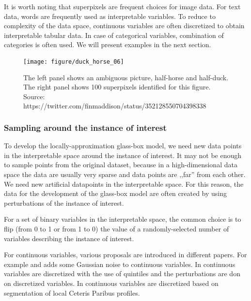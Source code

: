 \documentclass[12pt,]{krantz}
\begin{document}
It is worth noting that superpixels are frequent choices for image data. For text data, words are frequently used as interpretable variables. To reduce to complexity of the data space, continuous variables are often discretized to obtain interpretable tabular data. In case of categorical variables, combination of categories is often used. We will present examples in the next section.

\begin{figure}

{\centering \texttt{[image: figure/duck\_horse\_06]} 

}

\caption{The left panel shows an ambiguous picture, half-horse and half-duck. The right panel shows 100 superpixels identified for this figure. Source: https://twitter.com/finmaddison/status/352128550704398338}\label{fig:duckHorse06}
\end{figure}

\hypertarget{sampling-around-the-instance-of-interest}{%
\subsubsection{Sampling around the instance of interest}\label{sampling-around-the-instance-of-interest}}

To develop the locally-approximation glass-box model, we need new data points in the interpretable space around the instance of interest. It may not be enough to sample points from the original dataset, because in a high-dimensional data space the data are usually very sparse and data points are ,,far'' from each other. We need new artificial datapoints in the interpretable space. For this reason, the data for the development of the glass-box model are often created by using perturbations of the instance of interest.

For a set of binary variables in the interpretable space, the common choice is to flip (from 0 to 1 or from 1 to 0) the value of a randomly-selected number of variables describing the instance of interest.

For continuous variables, various proposals are introduced in different papers. For example \citep{imlRPackage} and \citep{molnar2019} adds some Gaussian noise to continuous variables. In \citep{limePackage} continuous variables are discretized with the use of quintiles and the perturbations are don on discretized variables. In \citep{localModelPackage} continuous variables are discretized based on segmentation of local Ceteris Paribus profiles.
\end{document}
